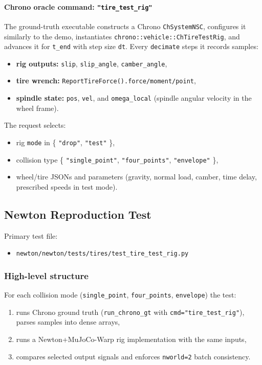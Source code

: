 \paragraph{Chrono oracle command: \texttt{"tire\_test\_rig"}}
The ground-truth executable constructs a Chrono \texttt{ChSystemNSC}, configures it similarly to the demo, instantiates
\texttt{chrono::vehicle::ChTireTestRig}, and advances it for \texttt{t\_end} with step size \texttt{dt}.
Every \texttt{decimate} steps it records samples:
\begin{itemize}
  \item \textbf{rig outputs:} \texttt{slip}, \texttt{slip\_angle}, \texttt{camber\_angle},
  \item \textbf{tire wrench:} \texttt{ReportTireForce().force/moment/point},
  \item \textbf{spindle state:} \texttt{pos}, \texttt{vel}, and \texttt{omega\_local} (spindle angular velocity in the wheel frame).
\end{itemize}
The request selects:
\begin{itemize}
  \item rig \texttt{mode} in \{ \texttt{"drop"}, \texttt{"test"} \},
  \item collision type \{ \texttt{"single\_point"}, \texttt{"four\_points"}, \texttt{"envelope"} \},
  \item wheel/tire JSONs and parameters (gravity, normal load, camber, time delay, prescribed speeds in test mode).
\end{itemize}

\subsection{Newton Reproduction Test}
Primary test file:
\begin{itemize}
  \item \texttt{newton/newton/tests/tires/test\_tire\_test\_rig.py}
\end{itemize}

\subsubsection{High-level structure}
For each collision mode (\texttt{single\_point}, \texttt{four\_points}, \texttt{envelope}) the test:
\begin{enumerate}
  \item runs Chrono ground truth (\texttt{run\_chrono\_gt} with \texttt{cmd="tire\_test\_rig"}), parses samples into dense arrays,
  \item runs a Newton+MuJoCo-Warp rig implementation with the same inputs,
  \item compares selected output signals and enforces \texttt{nworld=2} batch consistency.
\end{enumerate}

